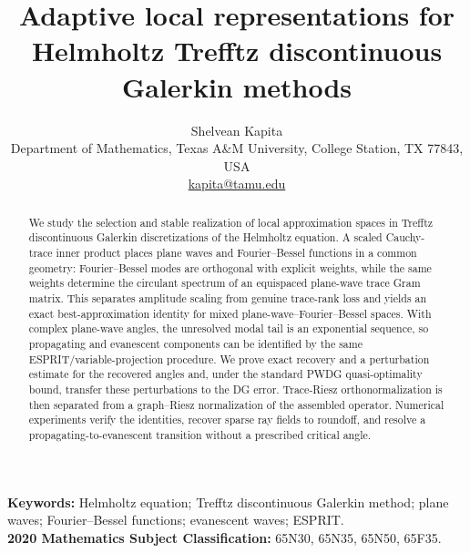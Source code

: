 \documentclass[11pt]{article}
\title{Adaptive local representations for Helmholtz Trefftz discontinuous Galerkin methods}
\author{Shelvean Kapita\\[3pt]\small Department of Mathematics, Texas A\&M University, College Station, TX 77843, USA\\\small \href{mailto:kapita@tamu.edu}{kapita@tamu.edu}}
\date{}
\numberwithin{equation}{section}
\begin{document}
\maketitle

\begin{abstract}
We study the selection and stable realization of local approximation spaces in Trefftz discontinuous Galerkin discretizations of the Helmholtz equation. A scaled Cauchy-trace inner product places plane waves and Fourier--Bessel functions in a common geometry: Fourier--Bessel modes are orthogonal with explicit weights, while the same weights determine the circulant spectrum of an equispaced plane-wave trace Gram matrix. This separates amplitude scaling from genuine trace-rank loss and yields an exact best-approximation identity for mixed plane-wave--Fourier--Bessel spaces. With complex plane-wave angles, the unresolved modal tail is an exponential sequence, so propagating and evanescent components can be identified by the same ESPRIT/variable-projection procedure. We prove exact recovery and a perturbation estimate for the recovered angles and, under the standard PWDG quasi-optimality bound, transfer these perturbations to the DG error. Trace-Riesz orthonormalization is then separated from a graph--Riesz normalization of the assembled operator. Numerical experiments verify the identities, recover sparse ray fields to roundoff, and resolve a propagating-to-evanescent transition without a prescribed critical angle.
\end{abstract}

\noindent\textbf{Keywords:} Helmholtz equation; Trefftz discontinuous Galerkin method; plane waves; Fourier--Bessel functions; evanescent waves; ESPRIT.\\
\textbf{2020 Mathematics Subject Classification:} 65N30, 65N35, 65N50, 65F35.
\vspace{1em}
\end{document}
